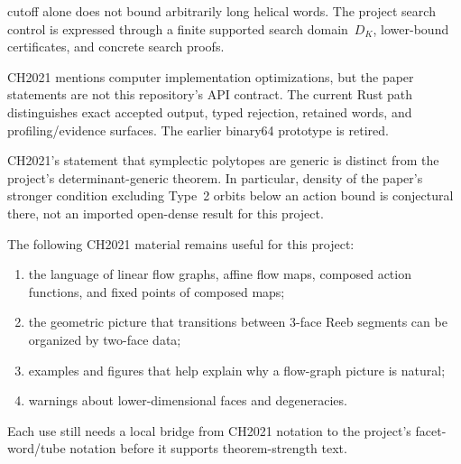 \begin{remark}
\begin{description}
    cutoff alone does not bound arbitrarily long helical words.  The project
    search control is expressed through a finite
    supported search domain~$D_K$, lower-bound certificates, and concrete
    search proofs.
  \item[Numerical implementation.]
    CH2021 mentions computer implementation optimizations, but the paper
    statements are not this repository's API contract. The current Rust path
    distinguishes exact accepted output, typed rejection, retained words, and
    profiling/evidence surfaces. The earlier binary64 prototype is retired.
\end{description}
CH2021's statement that symplectic polytopes are generic is distinct from the
project's determinant-generic theorem.  In particular, density of the
paper's stronger condition excluding Type~2 orbits below an action bound is
conjectural there, not an imported open-dense result for this project.
\end{remark}

\begin{remark}\label{rem:ch2021-useful-inputs}
The following CH2021 material remains useful for this project:
\begin{enumerate}
  \item the language of linear flow graphs, affine flow maps, composed action
    functions, and fixed points of composed maps;
  \item the geometric picture that transitions between 3-face Reeb segments can
    be organized by two-face data;
  \item examples and figures that help explain why a flow-graph picture is
    natural;
  \item warnings about lower-dimensional faces and degeneracies.
\end{enumerate}
Each use still needs a local bridge from CH2021 notation to the project's
facet-word/tube notation before it supports theorem-strength text.
\end{remark}

